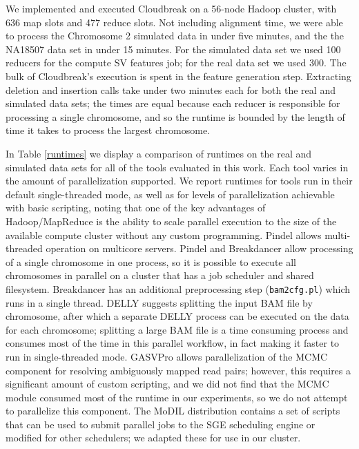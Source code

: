 We implemented and executed Cloudbreak on a 56-node Hadoop cluster, with 636 map slots and 477 reduce slots. Not including alignment time, we were able to process the Chromosome 2 simulated data in under five minutes, and the the NA18507 data set in under 15 minutes. For the simulated data set we used 100 reducers for the compute SV features job; for the real data set we used 300. The bulk of Cloudbreak's execution is spent in the feature generation step. Extracting deletion and insertion calls take under two minutes each for both the real and simulated data sets; the times are equal because each reducer is responsible for processing a single chromosome, and so the runtime is bounded by the length of time it takes to process the largest chromosome. 

In Table \ref{runtimes} we display a comparison of runtimes on the real and simulated data sets for all of the tools evaluated in this work. Each tool varies in the amount of parallelization supported. We report runtimes for tools run in their default single-threaded mode, as well as for levels of parallelization achievable with basic scripting, noting that one of the key advantages of Hadoop/MapReduce is the ability to scale parallel execution to the size of the available compute cluster without any custom programming. Pindel allows multi-threaded operation on multicore servers. Pindel and Breakdancer allow processing of a single chromosome in one process, so it is possible to execute all chromosomes in parallel on a cluster that has a job scheduler and shared filesystem. Breakdancer has an additional preprocessing step (\texttt{bam2cfg.pl}) which runs in a single thread. DELLY suggests splitting the input BAM file by chromosome, after which a separate DELLY process can be executed on the data for each chromosome; splitting a large BAM file is a time consuming process and consumes most of the time in this parallel workflow, in fact making it faster to run in single-threaded mode. GASVPro allows parallelization of the MCMC component for resolving ambiguously mapped read pairs; however, this requires a significant amount of custom scripting, and we did not find that the MCMC module consumed most of the runtime in our experiments, so we do not attempt to parallelize this component. The MoDIL distribution contains a set of scripts that can be used to submit parallel jobs to the SGE scheduling engine or modified for other schedulers; we adapted these for use in our cluster.

